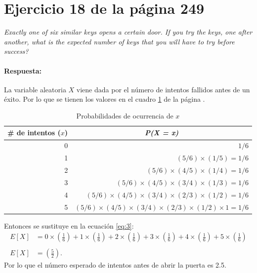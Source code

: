 \documentclass{article}
\begin{document}
\section{Ejercicio 18 de la página 249}  
  
\emph{Exactly one of six similar keys opens a certain door. If you try the keys, one after another, what is the expected number of keys that you will have to try before success?}

\paragraph{Respuesta:} La variable aleatoria $X$ viene dada por el número de intentos fallidos antes de un éxito. Por lo que se tienen los valores en el cuadro \ref{tab:5} de la página \pageref{tab:5}.

\begin{table}[H]
  \centering
  \caption{Probabilidades de ocurrencia de $x$}
    \begin{tabular}{rr}
    \toprule
    \multicolumn{1}{l}{\textbf{\# de intentos ($x$)}} & \multicolumn{1}{c}{\textit{\textbf{P(X = x)}}} \\

    \midrule
    0     & $1/6$ \\
    1     & $(5/6) \times (1/5)= 1/6$ \\
    2     & $(5/6)\times(4/5)\times(1/4)= 1/6$ \\
    3     & $(5/6)\times(4/5)\times(3/4)\times(1/3)= 1/6$ \\
    4     & $(5/6)\times(4/5)\times(3/4)\times(2/3)\times(1/2)= 1/6$ \\
    5     & $(5/6)\times(4/5)\times(3/4)\times(2/3)\times(1/2)\times1= 1/6$ \\
    \bottomrule
    \end{tabular}%
  \label{tab:5}%
\end{table}%
Entonces se sustituye en la ecuación \ref{eq:3}:
\begin{equation}
\begin{array}{ll}
   E[X] &= 0\times \left(\frac{1}{6}\right) + 1\times \left(\frac{1}{6}\right)+ 2\times \left(\frac{1}{6}\right)+ 3\times \left(\frac{1}{6}\right)+ 4\times \left(\frac{1}{6}\right)+ 5\times \left(\frac{1}{6}\right) \\
   &\\
   E[X] & =\left(\frac{5}{2}\right). 
   
  \end{array}
\end{equation}
Por lo que el número esperado de intentos antes de abrir la puerta es 2.5.
\end{document}
